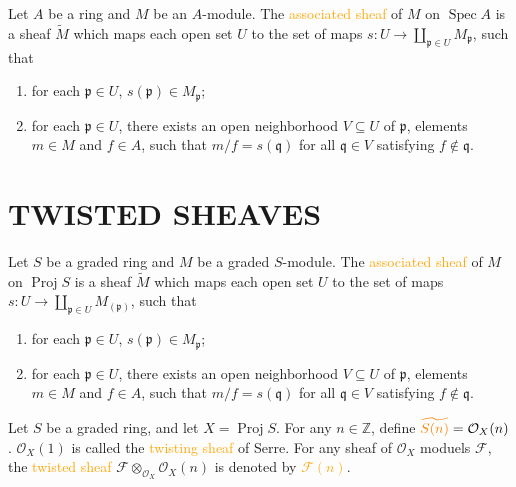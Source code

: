 \begin{definition}
	Let $A$ be a ring and $M$ be an $A$-module. The \textcolor{orange}{associated sheaf} of $M$ on $\operatorname{Spec}A$ is a sheaf $\tilde{M}$ which maps each open set $U$ to the set of maps $s:U\rightarrow\coprod_{\mathfrak{p}\in U}M_\mathfrak{p}$, such that
	\begin{enumerate}[label=\textup{(\arabic*)}]
		\item for each $\mathfrak{p}\in U$, $s(\mathfrak{p})\in M_\mathfrak{p}$;
		\item for each $\mathfrak{p}\in U$, there exists an open neighborhood $V\subseteq U$ of $\mathfrak{p}$, elements $m\in M$ and $f\in A$, such that $m/f=s(\mathfrak{q})$ for all $\mathfrak{q}\in V$ satisfying $f\notin\mathfrak{q}$.
	\end{enumerate}
\end{definition}


\section*{TWISTED SHEAVES}

\begin{definition}
	Let $S$ be a graded ring and $M$ be a graded $S$-module. The \textcolor{orange}{associated sheaf} of $M$ on $\operatorname{Proj}S$ is a sheaf $\tilde{M}$ which maps each open set $U$ to the set of maps $s:U\rightarrow\coprod_{\mathfrak{p}\in U}M_{(\mathfrak{p})}$, such that
	\begin{enumerate}[label=\textup{(\arabic*)}]
		\item for each $\mathfrak{p}\in U$, $s(\mathfrak{p})\in M_\mathfrak{p}$;
		\item for each $\mathfrak{p}\in U$, there exists an open neighborhood $V\subseteq U$ of $\mathfrak{p}$, elements $m\in M$ and $f\in A$, such that $m/f=s(\mathfrak{q})$ for all $\mathfrak{q}\in V$ satisfying $f\notin\mathfrak{q}$.
	\end{enumerate}
\end{definition}

\begin{definition}
	Let $S$ be a graded ring, and let $X=\operatorname{Proj}S$. For any $n\in\mathbb{Z}$, define $\mathcolor{orange}{\widetilde{S(n)}}=\mathcal{O}_X(n)$. $\mathcal{O}_X(1)$ is called the \textcolor{orange}{twisting sheaf} of Serre. For any sheaf of $\mathcal{O}_X$ moduels $\mathcal{F}$, the \textcolor{orange}{twisted sheaf} $\mathcal{F}\otimes_{\mathcal{O}_X}\mathcal{O}_X(n)$ is denoted by \textcolor{orange}{$\mathcal{F}(n)$}.
\end{definition}

